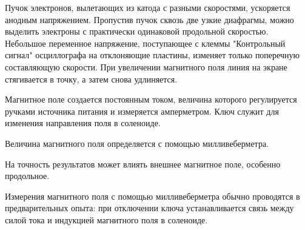 \documentclass[a4paper, 12pt]{article}%
\begin{document}
Пучок электронов, вылетающих из катода с разными скоростями, ускоряется анодным напряжением. Пропустив пучок сквозь две узкие диафрагмы, можно выделить электроны с практически одинаковой продольной скоростью. Небольшое переменное напряжение, поступающее с клеммы "Контрольный сигнал" осциллографа на отклоняющие пластины, изменяет только поперечную составляющую скорости. При увеличении магнитного поля линия на экране стягивается в точку, а затем снова удлиняется. 

Магнитное поле создается постоянным током, величина которого регулируется ручками источника питания и измеряется амперметром. Ключ служит для изменения направления поля в соленоиде.

Величина магнитного поля определяется с помощью милливеберметра.

На точность результатов может влиять внешнее магнитное поле, особенно продольное. 

Измерения магнитного поля с помощью милливеберметра обычно проводятся в предварительных опыта: при отключении ключа устанавливается связь между силой тока и индукцией магнитного поля в соленоиде. 
\end{document}
